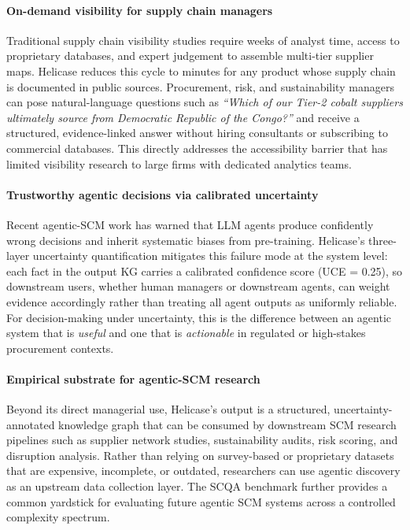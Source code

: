 \documentclass{article}
\begin{document}
\paragraph{On-demand visibility for supply chain managers}
Traditional supply chain visibility studies require weeks of analyst time, access to proprietary databases, and expert judgement to assemble multi-tier supplier maps. Helicase reduces this cycle to minutes for any product whose supply chain is documented in public sources. Procurement, risk, and sustainability managers can pose natural-language questions such as \textit{``Which of our Tier-2 cobalt suppliers ultimately source from Democratic Republic of the Congo?''} and receive a structured, evidence-linked answer without hiring consultants or subscribing to commercial databases. This directly addresses the accessibility barrier that has limited visibility research to large firms with dedicated analytics teams.

\paragraph{Trustworthy agentic decisions via calibrated uncertainty}
Recent agentic-SCM work has warned that LLM agents produce confidently wrong decisions \citep{menache2025generative, chen2025manager} and inherit systematic biases from pre-training. Helicase's three-layer uncertainty quantification mitigates this failure mode at the system level: each fact in the output KG carries a calibrated confidence score (UCE = 0.25), so downstream users, whether human managers or downstream agents, can weight evidence accordingly rather than treating all agent outputs as uniformly reliable. For decision-making under uncertainty, this is the difference between an agentic system that is \textit{useful} and one that is \textit{actionable} in regulated or high-stakes procurement contexts.

\paragraph{Empirical substrate for agentic-SCM research}
Beyond its direct managerial use, Helicase's output is a structured, uncertainty-annotated knowledge graph that can be consumed by downstream SCM research pipelines such as supplier network studies, sustainability audits, risk scoring, and disruption analysis. Rather than relying on survey-based or proprietary datasets that are expensive, incomplete, or outdated, researchers can use agentic discovery as an upstream data collection layer. The SCQA benchmark further provides a common yardstick for evaluating future agentic SCM systems across a controlled complexity spectrum.
\end{document}
